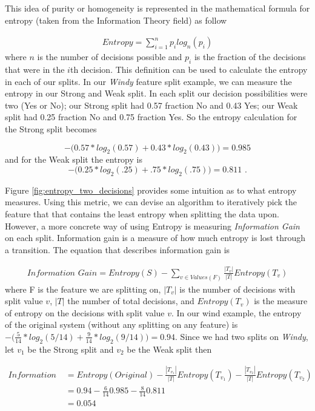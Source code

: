 This idea of purity or homogeneity is represented in the mathematical formula for entropy (taken from the Information Theory field) as follow

\begin{align}
Entropy = \sum_{i=1}^n p_i log_n(p_i)
\end{align}
where $n$ is the number of decisions possible and $p_i$ is the fraction of the decisions that were in the $i$th decision. This definition can be used to calculate the entropy in each of our splits. In our \textit{Windy} feature split example, we can measure the entropy in our Strong and Weak split. In each split our decision possibilities were two (Yes or No); our Strong split had 0.57 fraction No and 0.43 Yes; our Weak split had 0.25 fraction No and 0.75 fraction Yes. So the entropy calculation for the Strong split becomes

$$ - \Big(  0.57*log_2(0.57) + 0.43*log_2(0.43)  \Big) = 0.985$$
and for the Weak split the entropy is
$$ - \Big(  0.25*log_2(.25) + .75*log_2(.75)   \Big) = 0.811 \text{ .}$$

Figure \ref{fig:entropy_two_decisions} provides some intuition as to what entropy measures. Using this metric, we can devise an algorithm to iteratively pick the feature that that contains the least entropy when splitting the data upon. However, a more concrete way of using Entropy is measuring \textit{Information Gain} on each split. Information gain is a measure of how much entropy is lost through a transition. The equation that describes information gain is

\begin{align}
\textit{Information Gain} = Entropy(S) - \sum_{v\in Values(F)} \frac{|T_v|}{|T|}Entropy(T_v)
\end{align}
where F is the feature we are splitting on, $|T_v|$ is the number of decisions with split value $v$, $|T|$ the number of total decisions, and $Entropy(T_v)$ is the measure of entropy on the decisions with split value $v$. In our wind example, the entropy of the original system (without any splitting on any feature) is $-\big(\frac{5}{14}*log_2(5/14) + \frac{9}{14}*log_2(9/14) \big) =  0.94$. Since we had two splits on \textit{Windy}, let $v_1$ be the Strong split and $v_2$ be the Weak split then

\begin{align*}
  \textit{Information Gain(Windy)} &= Entropy(Original) - \frac{|T_{v_1}|}{|T|}Entropy(T_{v_1}) - \frac{|T_{v_2}|}{|T|}Entropy(T_{v_2}) \\
   &= 0.94 - \frac{6}{14}0.985 - \frac{8}{14}0.811 \\
   &= 0.054
\end{align*}


